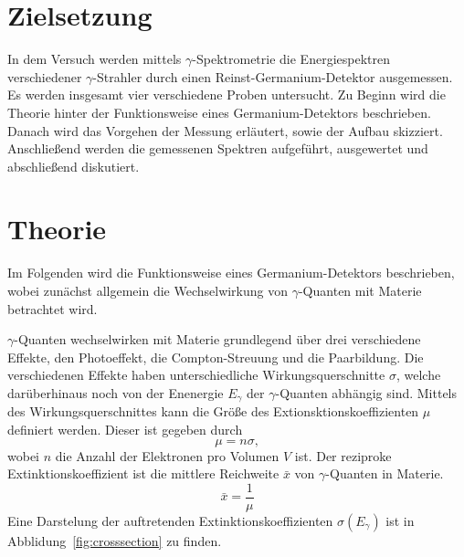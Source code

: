 \section{Zielsetzung}
\label{sec:zielsetzung}

In dem Versuch werden mittels $\gamma$-Spektrometrie die Energiespektren verschiedener
$\gamma$-Strahler durch einen Reinst-Germanium-Detektor ausgemessen.
Es werden insgesamt vier verschiedene Proben untersucht.
Zu Beginn wird die Theorie hinter der Funktionsweise eines Germanium-Detektors
beschrieben. Danach wird das Vorgehen der Messung erläutert, sowie der Aufbau
skizziert. Anschließend werden die gemessenen Spektren aufgeführt, ausgewertet und
abschließend diskutiert.

\section{Theorie}
\label{sec:theorie}

Im Folgenden wird die Funktionsweise eines Germanium-Detektors beschrieben,
wobei zunächst allgemein die Wechselwirkung von $\gamma$-Quanten mit Materie
betrachtet wird.

$\gamma$-Quanten wechselwirken mit Materie grundlegend über drei verschiedene Effekte,
den Photoeffekt, die Compton-Streuung und die Paarbildung.
Die verschiedenen Effekte haben unterschiedliche Wirkungsquerschnitte $\sigma$,
welche darüberhinaus noch von der Enenergie $E_{\gamma}$ der $\gamma$-Quanten abhängig sind.
Mittels des Wirkungsquerschnittes kann die Größe des Extionsktionskoeffizienten $\mu$
definiert werden. Dieser ist gegeben durch
\begin{equation}
  \label{eqn:ext}
  \mu = n\sigma,
\end{equation}
wobei $n$ die Anzahl der Elektronen pro Volumen $V$ ist.
Der reziproke Extinktionskoeffizient ist die mittlere Reichweite $\bar{x}$
von $\gamma$-Quanten in Materie.
\begin{equation}
  \bar{x} = \frac{1}{\mu}
\end{equation}
Eine Darstelung der auftretenden Extinktionskoeffizienten $\sigma(E_{\gamma})$ ist in
Abblidung~\ref{fig:crosssection} zu finden.

